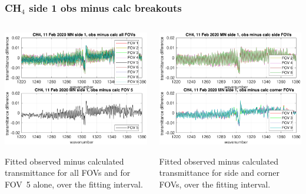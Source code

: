 \documentclass[9pt]{beamer}
\begin{document}
\begin{frame}
\frametitle{CH$_4$ side 1 obs minus calc breakouts}
\begin{columns}[t]
\begin{column}{0.5\textwidth}
  \begin{centering}
  \includegraphics[width=\textwidth]{02-11_mn_s1_CH4/CH4_breakout_1.pdf}
  \end{centering}\vspace{3mm}

Fitted observed minus calculated transmittance for all FOVs and for FOV~5
alone, over the fitting interval.

\end{column}
\begin{column}{0.5\textwidth}  
  \begin{centering}
  \includegraphics[width=\textwidth]{02-11_mn_s1_CH4/CH4_breakout_2.pdf}
  \end{centering}\vspace{3mm}

Fitted observed minus calculated transmittance for side and corner FOVs,
over the fitting interval.

\end{column}
\end{columns}
\end{frame}
\end{document}
